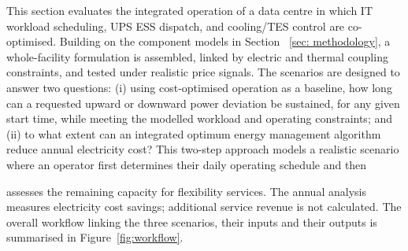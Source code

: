 \documentclass[lettersize,journal]{IEEEtran}
\providecommand{\DIFadd}[1]{{\color{blue}#1}}
\providecommand{\DIFaddbegin}{}
\providecommand{\DIFaddend}{}
\begin{document}
This section evaluates the integrated operation of a data centre in which IT workload scheduling, UPS ESS dispatch, and cooling/TES control are co-optimised. Building on the component models in Section \DIFaddbegin \DIFadd{~\ref{sec: methodology}}\DIFaddend , a whole-facility formulation is assembled, linked by electric and thermal coupling constraints, and tested under realistic price signals. The scenarios are designed to answer two questions: (i)  \DIFaddbegin \DIFadd{using }\DIFaddend cost-optimised operation as a baseline, how  \DIFaddbegin \DIFadd{long can a requested upward or downward power deviation be sustained, for any given start time, while meeting the modelled workload and operating constraints; and (ii) to what extent can an integrated optimum energy management algorithm reduce annual electricity cost? }\DIFaddend This two-step approach models a realistic scenario where an operator first determines their  \DIFaddbegin \DIFadd{daily operating }\DIFaddend schedule and then  \DIFaddbegin \DIFadd{assesses the remaining capacity for flexibility services. The annual analysis measures electricity cost savings; additional service revenue is not calculated. The overall workflow linking the three scenarios, their inputs and their outputs is summarised in Figure~\ref{fig:workflow}.

}\DIFaddend 
\end{document}
